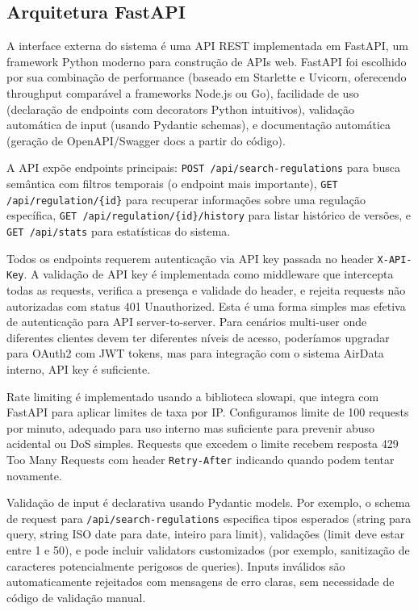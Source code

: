 \documentclass[12pt,a4paper]{article}
\begin{document}
\subsection{Arquitetura FastAPI}

A interface externa do sistema é uma API REST implementada em FastAPI, um framework Python moderno para construção de APIs web. FastAPI foi escolhido por sua combinação de performance (baseado em Starlette e Uvicorn, oferecendo throughput comparável a frameworks Node.js ou Go), facilidade de uso (declaração de endpoints com decorators Python intuitivos), validação automática de input (usando Pydantic schemas), e documentação automática (geração de OpenAPI/Swagger docs a partir do código).

A API expõe endpoints principais: \texttt{POST /api/search-regulations} para busca semântica com filtros temporais (o endpoint mais importante), \texttt{GET /api/regulation/\{id\}} para recuperar informações sobre uma regulação específica, \texttt{GET /api/regulation/\{id\}/history} para listar histórico de versões, e \texttt{GET /api/stats} para estatísticas do sistema.

Todos os endpoints requerem autenticação via API key passada no header \texttt{X-API-Key}. A validação de API key é implementada como middleware que intercepta todas as requests, verifica a presença e validade do header, e rejeita requests não autorizadas com status 401 Unauthorized. Esta é uma forma simples mas efetiva de autenticação para API server-to-server. Para cenários multi-user onde diferentes clientes devem ter diferentes níveis de acesso, poderíamos upgradar para OAuth2 com JWT tokens, mas para integração com o sistema AirData interno, API key é suficiente.

Rate limiting é implementado usando a biblioteca slowapi, que integra com FastAPI para aplicar limites de taxa por IP. Configuramos limite de 100 requests por minuto, adequado para uso interno mas suficiente para prevenir abuso acidental ou DoS simples. Requests que excedem o limite recebem resposta 429 Too Many Requests com header \texttt{Retry-After} indicando quando podem tentar novamente.

Validação de input é declarativa usando Pydantic models. Por exemplo, o schema de request para \texttt{/api/search-regulations} especifica tipos esperados (string para query, string ISO date para date, inteiro para limit), validações (limit deve estar entre 1 e 50), e pode incluir validators customizados (por exemplo, sanitização de caracteres potencialmente perigosos de queries). Inputs inválidos são automaticamente rejeitados com mensagens de erro claras, sem necessidade de código de validação manual.
\end{document}
